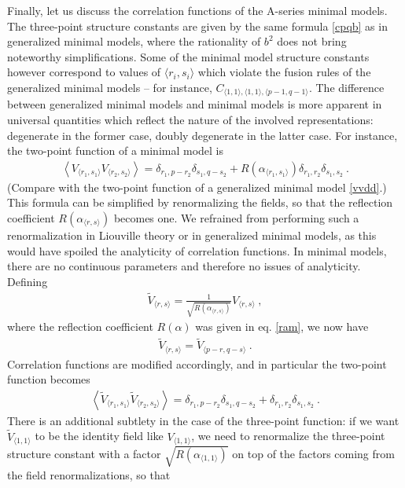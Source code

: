 \documentclass[12pt,a4paper,notitlepage]{report}
\numberwithin{equation}{section}
\theoremstyle{break}
\begin{document}
Finally, let us discuss the correlation functions of the A-series minimal models.
The three-point structure constants are given by the same formula \eqref{cpqb} as in generalized minimal models, where the rationality of $b^2$ does not bring noteworthy simplifications. 
Some of the minimal model structure constants however correspond to values of $\langle r_i,s_i\rangle$ which violate the fusion rules of the generalized minimal models -- for instance, $C_{\langle 1,1\rangle,\langle 1,1\rangle,\langle p-1,q-1\rangle}$. 
The difference between generalized minimal models and minimal models is more apparent in universal quantities which reflect the nature of the involved representations: degenerate in the former case, doubly degenerate in the latter case.
For instance, the two-point function of a minimal model is 
\begin{align}
 \left\langle V_{\langle r_1,s_1 \rangle} V_{\langle r_2,s_2 \rangle} \right\rangle = \delta_{r_1,p-r_2}\delta_{s_1,q-s_2} + R(\alpha_{\langle r_1,s_1 \rangle}) \delta_{r_1,r_2} \delta_{s_1,s_2} \ .
\label{vvddp}
\end{align}
(Compare with the two-point function of a generalized minimal model \eqref{vvdd}.) This formula can be simplified by renormalizing the fields, so that the reflection coefficient $R(\alpha_{\langle r,s\rangle})$ becomes one.
We refrained from performing such a renormalization in Liouville theory or in generalized minimal models, as this would have spoiled the analyticity of correlation functions.
In minimal models, there are no continuous parameters and therefore no issues of analyticity.
Defining
\begin{align}
 \boxed{\tilde{V}_{\langle r,s \rangle} = \frac{1}{\sqrt{R(\alpha_{\langle r,s \rangle})}} V_{\langle r,s \rangle}}\ , 
\end{align}
where the reflection coefficient $R(\alpha)$ was given in eq. \eqref{ram}, we now have 
\begin{align}
 \tilde{V}_{\langle r,s \rangle} = \tilde{V}_{\langle p-r,q-s \rangle}\ .
\end{align}
Correlation functions are modified accordingly, and in particular the two-point function becomes
\begin{align}
 \boxed{\left\langle \tilde{V}_{\langle r_1,s_1 \rangle} \tilde{V}_{\langle r_2,s_2 \rangle} \right\rangle = \delta_{r_1,p-r_2}\delta_{s_1,q-s_2} + \delta_{r_1,r_2} \delta_{s_1,s_2}} \ .
\end{align}
There is an additional subtlety in the case of the three-point function: if we want $\tilde{V}_{\langle 1,1 \rangle}$ to be the identity field like $V_{\langle 1,1 \rangle}$, we need to renormalize the three-point structure constant with a factor $\sqrt{R(\alpha_{\langle 1,1 \rangle})}$ on top of the factors coming from the field renormalizations, so that 
\end{document}
